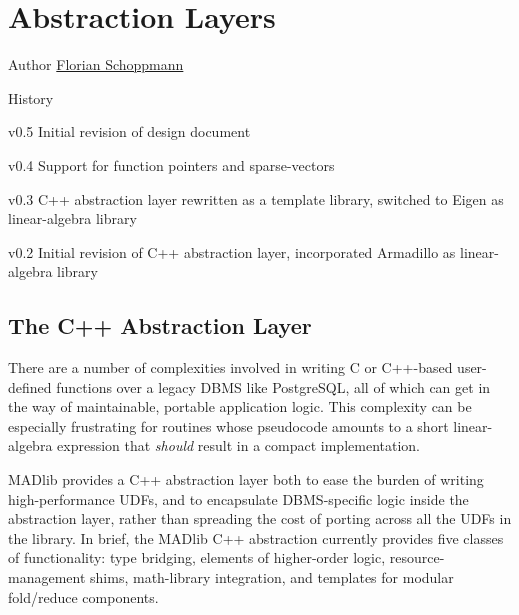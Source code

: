 
\chapter{Abstraction Layers}

\begin{moduleinfo}
\item[Author] \href{mailto:Florian.Schoppmann@emc.com}{Florian Schoppmann}
\item[History]
	\begin{modulehistory}
		\item[v0.5] Initial revision of design document
		\item[v0.4] Support for function pointers and sparse-vectors
		\item[v0.3] C++ abstraction layer rewritten as a template library, switched to Eigen \cite{eigen} as linear-algebra library
		\item[v0.2] Initial revision of C++ abstraction layer, incorporated Armadillo \cite{armadillo} as linear-algebra library
	\end{modulehistory}
\end{moduleinfo}


\section{The C++ Abstraction Layer}

There are a number of complexities involved in writing C or C++-based user-defined functions over a legacy DBMS like PostgreSQL, all of which can get in the way of maintainable, portable application logic. This complexity can be especially frustrating for routines whose pseudocode amounts to a short linear-algebra expression that \emph{should} result in a compact implementation.

MADlib provides a C++ abstraction layer both to ease the burden of writing high-performance UDFs, and to encapsulate DBMS-specific logic inside the abstraction layer, rather than spreading the cost of porting across all the UDFs in the library. In brief, the MADlib C++ abstraction currently provides five classes of functionality: type bridging, elements of higher-order logic, resource-management shims, math-library integration, and templates for modular fold/reduce components.

